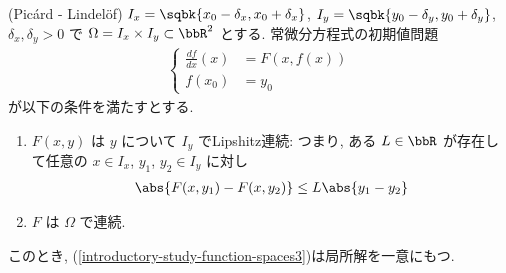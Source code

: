 \documentclass[openany, a4paper, oneside]{jsbook}
\begin{document}
\begin{thm}(Pic\'ard - Lindel\"of)
 $I_x = \sqbk{x_0 - \delta_x, x_0 + \delta_x}$, $I_y = \sqbk{y_0 - \delta_y, y_0 + \delta_y}$,
 $\delta_x, \delta_y>0$ で $\Omega = I_x \times I_y \subset \bbR^2$ とする.
 常微分方程式の初期値問題
\begin{align}
 \begin{cases}
  \frac{df}{dx}(x)
  &=
  F(x, f(x)) \\
  f(x_0)
  &=
  y_0
 \end{cases} \label{introductory-study-function-spaces3}
\end{align}
が以下の条件を満たすとする.
\begin{enumerate}
\item $F(x, y)$ は $y$ について $I_y$ でLipshitz連続:
つまり, ある $L \in \bbR$ が存在して任意の $x \in I_x$, $y_1$, $y_2 \in I_y$ に対し
\begin{align*}
 \abs{F(x, y_1) - F(x, y_2)}
 \leq
 L \abs{y_1 - y_2}
\end{align*}
\item $F$ は $\Omega$ で連続.
\end{enumerate}
このとき, (\ref{introductory-study-function-spaces3})は局所解を一意にもつ.
\end{thm}
\end{document}
